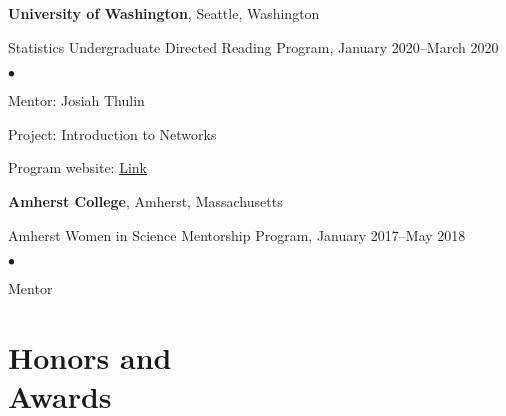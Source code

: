 \documentclass[margin,centered]{res}
\newenvironment{list1}{
  \begin{list}{\ding{113}}{%
      \setlength{\itemsep}{0in}
      \setlength{\parsep}{0in} \setlength{\parskip}{0in}
      \setlength{\topsep}{0in} \setlength{\partopsep}{0in}
      \setlength{\leftmargin}{0.17in}}}{\end{list}}
\newenvironment{list2}{
  \begin{list}{$\bullet$}{%
      \setlength{\itemsep}{0in}
      \setlength{\parsep}{0in} \setlength{\parskip}{0in}
      \setlength{\topsep}{0in} \setlength{\partopsep}{0in}
      \setlength{\leftmargin}{0.2in}}}{\end{list}}
\begin{document}
\begin{resume}
{\bf University of Washington}, Seattle, Washington
\begin{list1}
\item[] Statistics Undergraduate Directed Reading Program, January 2020--March 2020
\begin{list2}
\vspace*{.05in}
\item Mentor: Josiah Thulin
\item Project: Introduction to Networks
\item Program website: \href{https://spa-drp.github.io}{Link}
\end{list2}
\end{list1}

{\bf Amherst College}, Amherst, Massachusetts
\begin{list1}
\item[] Amherst Women in Science Mentorship Program, January 2017--May 2018 
\begin{list2}
\vspace*{.05in}
\item Mentor
\end{list2}
\end{list1}









\section{\sc Honors and\\ Awards}


\end{resume}
\end{document}
